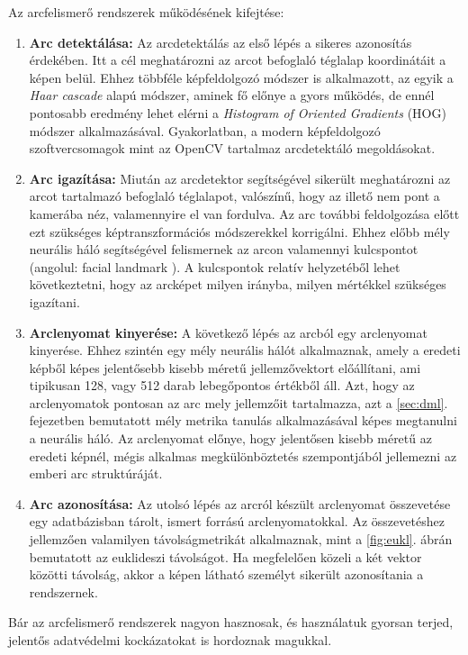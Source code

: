 Az arcfelismerő rendszerek működésének kifejtése:

\begin{enumerate}
	\item \textbf{Arc detektálása:} Az arcdetektálás az első lépés a sikeres azonosítás érdekében. Itt a cél meghatározni az arcot befoglaló téglalap koordinátáit a képen belül. Ehhez többféle képfeldolgozó módszer is alkalmazott, az egyik a \textit{Haar cascade} alapú módszer, aminek fő előnye a gyors működés, de ennél pontosabb eredmény lehet elérni a \textit{Histogram of Oriented Gradients} (HOG) módszer alkalmazásával. Gyakorlatban, a modern képfeldolgozó szoftvercsomagok mint az OpenCV \cite{opencv_library} tartalmaz arcdetektáló megoldásokat.
	\item \textbf{Arc igazítása:} Miután az arcdetektor segítségével sikerült meghatározni az arcot tartalmazó befoglaló téglalapot, valószínű, hogy az illető nem pont a kamerába néz, valamennyire el van fordulva. Az arc további feldolgozása előtt ezt szükséges képtranszformációs módszerekkel korrigálni. Ehhez előbb mély neurális háló segítségével felismernek az arcon valamennyi kulcspontot (angolul: facial landmark \cite{kazemi2014faciallandmark}). A kulcspontok relatív helyzetéből lehet következtetni, hogy az arcképet milyen irányba, milyen mértékkel szükséges igazítani.
	\item \textbf{Arclenyomat kinyerése:} A következő lépés az arcból egy arclenyomat kinyerése. Ehhez szintén egy mély neurális hálót alkalmaznak, amely a eredeti képből képes jelentősebb kisebb méretű jellemzővektort előállítani, ami tipikusan 128, vagy 512 darab lebegőpontos értékből áll. Azt, hogy az arclenyomatok pontosan az arc mely jellemzőit tartalmazza, azt a \ref{sec:dml}. fejezetben bemutatott mély metrika tanulás alkalmazásával képes megtanulni a neurális háló. Az arclenyomat előnye, hogy jelentősen kisebb méretű az eredeti képnél, mégis alkalmas megkülönböztetés szempontjából jellemezni az emberi arc struktúráját.
	\item \textbf{Arc azonosítása:} Az utolsó lépés az arcról készült arclenyomat összevetése egy adatbázisban tárolt, ismert forrású arclenyomatokkal. Az összevetéshez jellemzően valamilyen távolságmetrikát alkalmaznak, mint a \ref{fig:eukl}. ábrán bemutatott az euklideszi távolságot. Ha megfelelően közeli a két vektor közötti távolság, akkor a képen látható személyt sikerült azonosítania a rendszernek.
\end{enumerate}

Bár az arcfelismerő rendszerek nagyon hasznosak, és használatuk gyorsan terjed, jelentős adatvédelmi kockázatokat is hordoznak magukkal. \cite{castelluccia2020impact}

